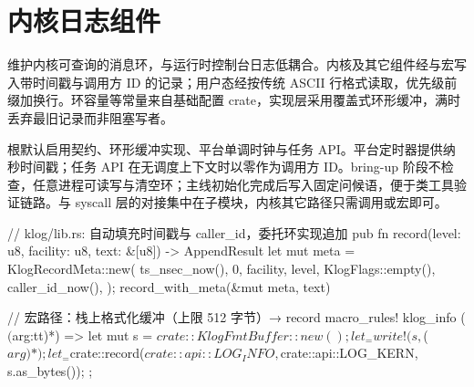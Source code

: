 
\section{内核日志组件}

维护内核可查询的消息环，与运行时控制台日志低耦合。内核及其它组件经与宏写入带时间戳与调用方 ID 的记录；用户态经按传统 ASCII 行格式读取，优先级前缀加换行。环容量等常量来自基础配置 crate，实现层采用覆盖式环形缓冲，满时丢弃最旧记录而非阻塞写者。

根默认启用契约、环形缓冲实现、平台单调时钟与任务 API。平台定时器提供纳秒时间戳；任务 API 在无调度上下文时以零作为调用方 ID。bring-up 阶段不检查，任意进程可读写与清空环；主线初始化完成后写入固定问候语，便于类工具验证链路。与 syscall 层的对接集中在子模块，内核其它路径只需调用或宏即可。

\begin{rustcode}
// klog/lib.rs: 自动填充时间戳与 caller_id，委托环实现追加
pub fn record(level: u8, facility: u8, text: &[u8]) -> AppendResult {
    let mut meta = KlogRecordMeta::new(
        ts_nsec_now(), 0, facility, level, KlogFlags::empty(), caller_id_now(),
    );
    record_with_meta(&mut meta, text)
}
\end{rustcode}

\begin{rustcode}
// 宏路径：栈上格式化缓冲（上限 512 字节）→ record
macro_rules! klog_info {
    ($($arg:tt)*) => {{
        let mut s = $crate::KlogFmtBuffer::new();
        let _ = write!(s, $($arg)*);
        let _ = $crate::record($crate::api::LOG_INFO, $crate::api::LOG_KERN, s.as_bytes());
    }};
}
\end{rustcode}
